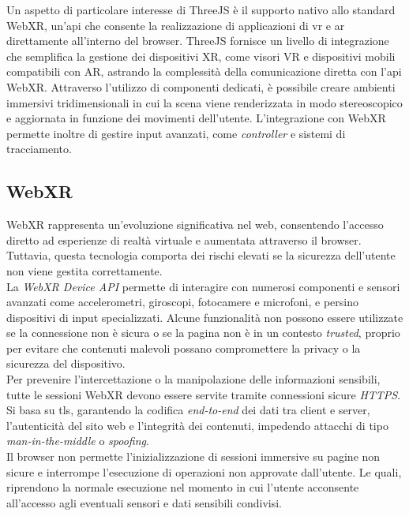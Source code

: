 \documentclass[12pt,a4paper,openright,oneside]{book}
\begin{document}
%
Un aspetto di particolare interesse di ThreeJS è il supporto nativo allo standard WebXR, un’\ac{api} che consente la realizzazione di applicazioni di \ac{vr} e \ac{ar} direttamente all’interno del browser. ThreeJS fornisce un livello di integrazione che semplifica la gestione dei dispositivi XR, come visori VR e dispositivi mobili compatibili con AR, astrando la complessità della comunicazione diretta con l’\ac{api} WebXR.
%
Attraverso l’utilizzo di componenti dedicati, è possibile creare ambienti immersivi tridimensionali in cui la scena viene renderizzata in modo stereoscopico e aggiornata in funzione dei movimenti dell’utente. L’integrazione con WebXR permette inoltre di gestire input avanzati, come \textit{controller} e sistemi di tracciamento.
%
\subsection{WebXR}\label{sub:webxr} %
WebXR rappresenta un’evoluzione significativa nel web, consentendo l’accesso diretto ad esperienze di realtà virtuale e aumentata attraverso il browser. Tuttavia, questa tecnologia comporta dei rischi elevati se la sicurezza dell'utente non viene gestita correttamente.
\\
La \textit{WebXR Device API} permette di interagire con numerosi componenti e sensori avanzati come accelerometri, giroscopi, fotocamere e microfoni, e persino dispositivi di input specializzati.
Alcune funzionalità non possono essere utilizzate se la connessione non è sicura o se la pagina non è in un contesto \textit{trusted}, proprio per evitare che contenuti malevoli possano compromettere la privacy o la sicurezza del dispositivo.
\\
Per prevenire l'intercettazione o la manipolazione delle informazioni sensibili, tutte le sessioni WebXR devono essere servite tramite connessioni sicure \textit{HTTPS}. Si basa su \ac{tls}, garantendo la codifica \textit{end-to-end} dei dati tra client e server, l'autenticità del sito web e l'integrità dei contenuti, impedendo attacchi di tipo \textit{man-in-the-middle} o \textit{spoofing}.
\\
Il browser non permette l’inizializzazione di sessioni immersive su pagine non sicure e interrompe l'esecuzione di operazioni non approvate dall’utente. Le quali, riprendono la normale esecuzione nel momento in cui l'utente acconsente all’accesso agli eventuali sensori e dati sensibili condivisi.
%
%
\end{document}
